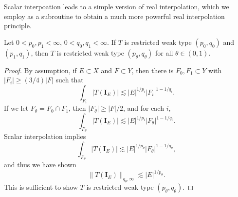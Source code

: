 Scalar interpoation leads to a simple version of real interpolation, which we employ as a subroutine to obtain a much more powerful real interpolation principle.

\begin{lemma}
  Let $0 < p_0,p_1 < \infty$, $0 < q_0,q_1 < \infty$. If $T$ is restricted weak type $(p_0,q_0)$ and $(p_1,q_1)$, then $T$ is restricted weak type $(p_\theta,q_\theta)$ for all $\theta \in (0,1)$.
\end{lemma}
\begin{proof}
  By assumption, if $E \subset X$ and $F \subset Y$, then there is $F_0, F_1 \subset Y$ with $|F_i| \geq (3/4)|F|$ such that
  \[ \int_{F_i} |T(\mathbf{I}_E)| \lesssim |E|^{1/p_i} |F_i|^{1 - 1/q_i}. \]
  If we let $F_\theta = F_0 \cap F_1$, then $|F_\theta| \geq |F|/2$, and for each $i$,
  \[ \int_{F_\theta} |T(\mathbf{I}_E)| \lesssim |E|^{1/p_i} |F_\theta|^{1 - 1/q_i}. \]
  Scalar interpolation implies
  \[ \int_{F_\theta} |T(\mathbf{I}_E)| \lesssim |E|^{1/p_\theta} |F_\theta|^{1 - 1/q_\theta}, \]
  and thus we have shown
  \[ \| T(\mathbf{I}_E) \|_{q_\theta,\infty} \lesssim |E|^{1/p_\theta}. \]
  This is sufficient to show $T$ is restricted weak type $(p_\theta,q_\theta)$.
\end{proof}

